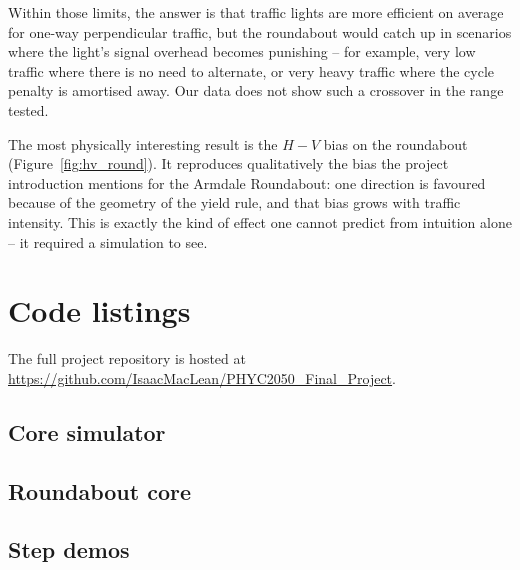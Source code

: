 \documentclass[11pt]{article}
\begin{document}
Within those limits, the answer is that traffic lights are more efficient on average for one-way perpendicular traffic, but the roundabout would catch up in scenarios where the light's signal overhead becomes punishing -- for example, very low traffic where there is no need to alternate, or very heavy traffic where the cycle penalty is amortised away. Our data does not show such a crossover in the range tested.

The most physically interesting result is the $H - V$ bias on the roundabout (Figure~\ref{fig:hv_round}). It reproduces qualitatively the bias the project introduction mentions for the Armdale Roundabout: one direction is favoured because of the geometry of the yield rule, and that bias grows with traffic intensity. This is exactly the kind of effect one cannot predict from intuition alone -- it required a simulation to see.

\appendix
\section{Code listings}\label{sec:appendix-code}

The full project repository is hosted at\\
\url{https://github.com/IsaacMacLean/PHYC2050_Final_Project}.

\subsection{Core simulator}


\subsection{Roundabout core}


\subsection{Step demos}




\end{document}
